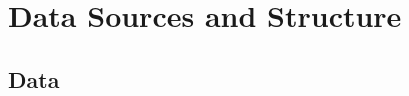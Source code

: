 \documentclass[table,10pt]{beamer}
\begin{document}
%
%
%
%
%
%
%
%
%
%
%


\section{Data Sources and Structure}\subsection{Data}
\end{document}
